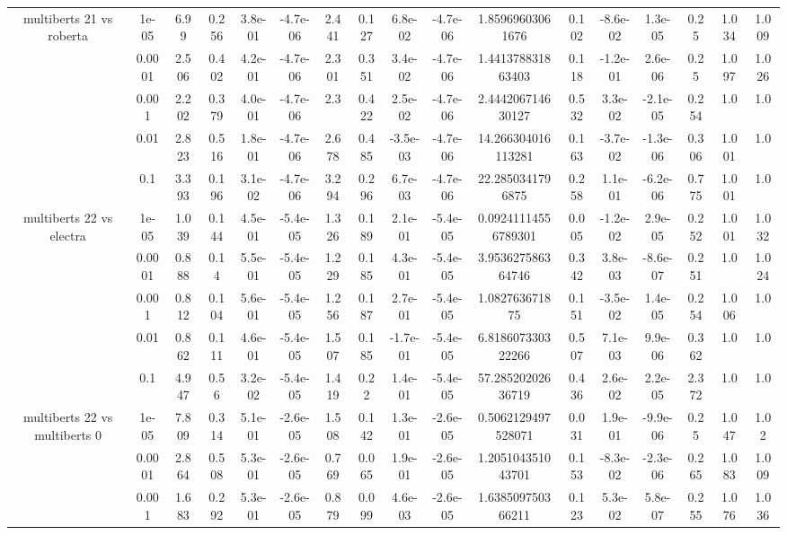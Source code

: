\begin{tabular}{|c|c|c|c|c|c|c|c|c|c|c|c|c|c|c|c|c|}
\hline
\multirow{5}{*}{multiberts 21 vs roberta } & 1e-05 & 6.99 & 0.256 & 3.8e-01 & -4.7e-06 & 2.441 & 0.127 & 6.8e-02 & -4.7e-06 & 1.85969603061676 & 0.102 & -8.6e-02 & 1.3e-05 & 0.25 & 1.034 & 1.009 \\
 & 0.0001 & 2.506 & 0.402 & 4.2e-01 & -4.7e-06 & 2.301 & 0.351 & 3.4e-02 & -4.7e-06 & 1.441378831863403 & 0.118 & -1.2e-01 & 2.6e-06 & 0.25 & 1.097 & 1.026 \\
 & 0.001 & 2.202 & 0.379 & 4.0e-01 & -4.7e-06 & 2.3 & 0.422 & 2.5e-02 & -4.7e-06 & 2.444206714630127 & 0.532 & 3.3e-02 & -2.1e-05 & 0.254 & 1.0 & 1.0 \\
 & 0.01 & 2.823 & 0.516 & 1.8e-01 & -4.7e-06 & 2.678 & 0.485 & -3.5e-03 & -4.7e-06 & 14.266304016113281 & 0.163 & -3.7e-02 & -1.3e-06 & 0.306 & 1.001 & 1.0 \\
 & 0.1 & 3.393 & 0.196 & 3.1e-02 & -4.7e-06 & 3.294 & 0.296 & 6.7e-03 & -4.7e-06 & 22.2850341796875 & 0.258 & 1.1e-01 & -6.2e-06 & 0.775 & 1.001 & 1.0 \\
\hline
\multirow{5}{*}{multiberts 22 vs electra } & 1e-05 & 1.039 & 0.144 & 4.5e-01 & -5.4e-05 & 1.326 & 0.189 & 2.1e-01 & -5.4e-05 & 0.09241114556789301 & 0.005 & -1.2e-02 & 2.9e-05 & 0.252 & 1.001 & 1.032 \\
 & 0.0001 & 0.888 & 0.14 & 5.5e-01 & -5.4e-05 & 1.229 & 0.185 & 4.3e-01 & -5.4e-05 & 3.953627586364746 & 0.342 & 3.8e-03 & -8.6e-07 & 0.251 & 1.0 & 1.024 \\
 & 0.001 & 0.812 & 0.104 & 5.6e-01 & -5.4e-05 & 1.256 & 0.187 & 2.7e-01 & -5.4e-05 & 1.082763671875 & 0.151 & -3.5e-02 & 1.4e-05 & 0.254 & 1.006 & 1.0 \\
 & 0.01 & 0.862 & 0.111 & 4.6e-01 & -5.4e-05 & 1.507 & 0.185 & -1.7e-01 & -5.4e-05 & 6.818607330322266 & 0.507 & 7.1e-03 & 9.9e-06 & 0.362 & 1.0 & 1.0 \\
 & 0.1 & 4.947 & 0.56 & 3.2e-02 & -5.4e-05 & 1.419 & 0.22 & 1.4e-01 & -5.4e-05 & 57.28520202636719 & 0.436 & 2.6e-02 & 2.2e-05 & 2.372 & 1.0 & 1.0 \\
\hline
\multirow{5}{*}{multiberts 22 vs multiberts 0} & 1e-05 & 7.809 & 0.314 & 5.1e-01 & -2.6e-05 & 1.508 & 0.142 & 1.3e-01 & -2.6e-05 & 0.5062129497528071 & 0.031 & 1.9e-01 & -9.9e-06 & 0.25 & 1.047 & 1.02 \\
 & 0.0001 & 2.864 & 0.508 & 5.3e-01 & -2.6e-05 & 0.769 & 0.065 & 1.9e-01 & -2.6e-05 & 1.205104351043701 & 0.153 & -8.3e-02 & -2.3e-06 & 0.265 & 1.083 & 1.009 \\
 & 0.001 & 1.683 & 0.292 & 5.3e-01 & -2.6e-05 & 0.879 & 0.099 & 4.6e-03 & -2.6e-05 & 1.638509750366211 & 0.123 & 5.3e-02 & 5.8e-07 & 0.255 & 1.076 & 1.036 \\

\end{tabular}
